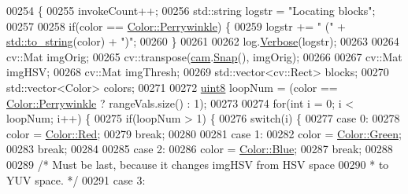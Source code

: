 \begin{DoxyCode}
00254                                            \{
00255         invokeCount++;
00256         std::string logstr = \textcolor{stringliteral}{"Locating blocks"};
00257 
00258         \textcolor{keywordflow}{if}(color == \hyperlink{definitions_8hpp_abc05a0f46084a3477cf5d5c939ff1436a1e700ac224a6d34c5b171bb6f462aa41}{Color::Perrywinkle}) \{
00259             logstr += \textcolor{stringliteral}{" ("} + \hyperlink{namespacestd_aa5ddf582a1c96ffe258c997be9a294a3}{std::to\_string}(color) + \textcolor{stringliteral}{")"};
00260         \}
00261 
00262         log.\hyperlink{classChipChipArray_1_1Log_a154a5f38d9c7a767693b242684a3d4d9}{Verbose}(logstr);
00263 
00264         cv::Mat imgOrig;
00265         cv::transpose(\hyperlink{classChipChipArray_1_1Grabber_a726bcc2367a719cb84de92a981947622}{cam}.\hyperlink{classChipChipArray_1_1PiCamera_a58fb0de02570dce9a9cb60a1a04fb84f}{Snap}(), imgOrig);
00266 
00267         cv::Mat imgHSV;
00268         cv::Mat imgThresh;
00269         std::vector<cv::Rect> blocks;
00270         std::vector<Color> colors;
00271 
00272         \hyperlink{definitions_8hpp_adde6aaee8457bee49c2a92621fe22b79}{uint8} loopNum = (color == \hyperlink{definitions_8hpp_abc05a0f46084a3477cf5d5c939ff1436a1e700ac224a6d34c5b171bb6f462aa41}{Color::Perrywinkle} ? rangeVals.size() : 1);
00273 
00274         \textcolor{keywordflow}{for}(\textcolor{keywordtype}{int} i = 0; i < loopNum; i++) \{
00275             \textcolor{keywordflow}{if}(loopNum > 1) \{
00276                 \textcolor{keywordflow}{switch}(i) \{
00277                     \textcolor{keywordflow}{case} 0:
00278                         color = \hyperlink{definitions_8hpp_abc05a0f46084a3477cf5d5c939ff1436aee38e4d5dd68c4e440825018d549cb47}{Color::Red};
00279                         \textcolor{keywordflow}{break};
00280 
00281                     \textcolor{keywordflow}{case} 1:
00282                         color = \hyperlink{definitions_8hpp_abc05a0f46084a3477cf5d5c939ff1436ad382816a3cbeed082c9e216e7392eed1}{Color::Green};
00283                         \textcolor{keywordflow}{break};
00284 
00285                     \textcolor{keywordflow}{case} 2:
00286                         color = \hyperlink{definitions_8hpp_abc05a0f46084a3477cf5d5c939ff1436a9594eec95be70e7b1710f730fdda33d9}{Color::Blue};
00287                         \textcolor{keywordflow}{break};
00288 
00289                         \textcolor{comment}{/* Must be last, because it changes imgHSV from HSV space}
00290 \textcolor{comment}{                         * to YUV space. */}
00291                     \textcolor{keywordflow}{case} 3: 

\end{DoxyCode}
